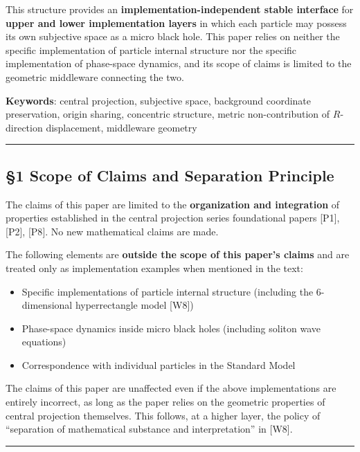 \documentclass[
  a4paper,11pt]{article}
\providecommand{\tightlist}{%
  \setlength{\itemsep}{0pt}\setlength{\parskip}{0pt}}
\begin{document}
This structure provides an \textbf{implementation-independent stable
interface} for \textbf{upper and lower implementation layers} in which
each particle may possess its own subjective space as a micro black
hole. This paper relies on neither the specific implementation of
particle internal structure nor the specific implementation of
phase-space dynamics, and its scope of claims is limited to the
geometric middleware connecting the two.

\textbf{Keywords}: central projection, subjective space, background
coordinate preservation, origin sharing, concentric structure, metric
non-contribution of \(R\)-direction displacement, middleware geometry

\begin{center}\rule{0.5\linewidth}{0.5pt}\end{center}

\subsection{§1 Scope of Claims and Separation
Principle}\label{scope-of-claims-and-separation-principle}

The claims of this paper are limited to the \textbf{organization and
integration} of properties established in the central projection series
foundational papers {[}P1{]}, {[}P2{]}, {[}P8{]}. No new mathematical
claims are made.

The following elements are \textbf{outside the scope of this paper's
claims} and are treated only as implementation examples when mentioned
in the text:

\begin{itemize}
\tightlist
\item
  Specific implementations of particle internal structure (including the
  6-dimensional hyperrectangle model {[}W8{]})
\item
  Phase-space dynamics inside micro black holes (including soliton wave
  equations)
\item
  Correspondence with individual particles in the Standard Model
\end{itemize}

The claims of this paper are unaffected even if the above
implementations are entirely incorrect, as long as the paper relies on
the geometric properties of central projection themselves. This follows,
at a higher layer, the policy of ``separation of mathematical substance
and interpretation'' in {[}W8{]}.

\begin{center}\rule{0.5\linewidth}{0.5pt}\end{center}
\end{document}
